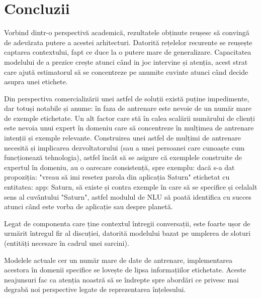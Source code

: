 \chapter{Concluzii}

Vorbind dintr-o perspectivă academică, rezultatele obținute reușesc să convingă de adevărata putere a acestei arhitecturi.
Datorită rețelelor recurente se reușește captarea contextului, fapt ce duce la o putere mare de generalizare. Capacitatea modelului de a prezice crește atunci când in joc intervine și atenția, acest strat care ajută estimatorul să se concentreze pe anumite cuvinte atunci când decide asupra unei etichete.

Din perspectiva comercializării unei astfel de soluții există puține impedimente, dar totuși notabile și anume: în faza de antrenare este nevoie de un număr mare de exemple etichetate. Un alt factor care stă în calea scalării numărului de clienți este nevoia unui expert în domeniu care să concentreze în mulțimea de antrenare intenții și exemple relevante. Construirea unei astfel de mulțimi de antrenare necesită și implicarea dezvoltatorului (sau a unei persoanei care cunoaște cum funcționează tehnologia), astfel încât să se asigure că exemplele construite de expertul în domeniu, au o oarecare consistență, spre exemplu: dacă s-a dat propoziția: "vreau să imi resetez parola din aplicația Saturn" etichetat cu entitatea: app: Saturn, să existe și contra exemple în care să se specifice și celalalt sens al cuvântului "Saturn", astfel modulul de NLU să poată identifica cu succes atunci când este vorba de aplicație sau despre planetă.

Legat de componenta care ține contextul întregii conversații, este foarte ușor de urmărit întregul fir al discuției, datorită modelului bazat pe umplerea de sloturi (entități necesare în cadrul unei sarcini).

Modelele actuale cer un număr mare de date de antrenare, implementarea acestora în domenii specifice se lovește de lipsa informațiilor etichetate. Aceste neajunsuri fac ca atenția noastră să se îndrepte spre abordări ce privesc mai degrabă noi perspective legate de reprezentarea înțelesului.